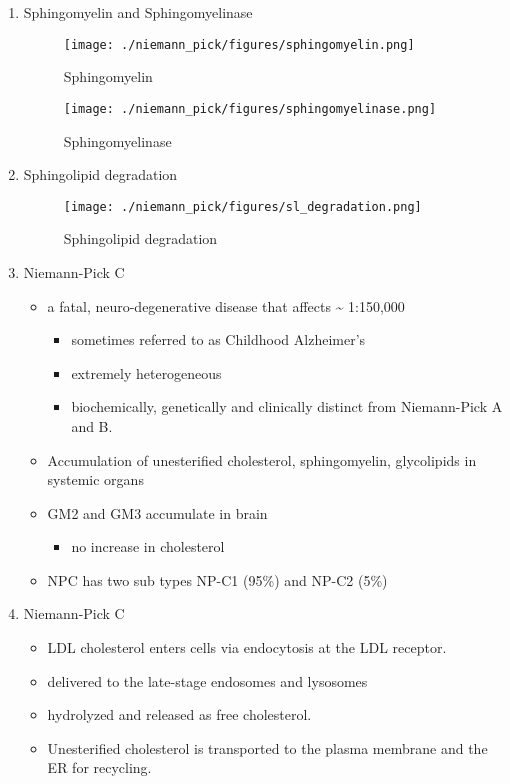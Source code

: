 \documentclass{scrartcl}
\begin{document}
\begin{enumerate}
\item Sphingomyelin and Sphingomyelinase
\label{sec:org6ebf8ad}

\begin{figure}[htbp]
\centering
\texttt{[image: ./niemann\_pick/figures/sphingomyelin.png]}
\caption{\label{fig:org360e3c4}
Sphingomyelin}
\end{figure}

\begin{figure}[htbp]
\centering
\texttt{[image: ./niemann\_pick/figures/sphingomyelinase.png]}
\caption{\label{fig:orgd3763f2}
Sphingomyelinase}
\end{figure}


\item Sphingolipid degradation
\label{sec:org2abaf29}

\begin{figure}[htbp]
\centering
\texttt{[image: ./niemann\_pick/figures/sl\_degradation.png]}
\caption{\label{fig:orgc3dab82}
Sphingolipid degradation}
\end{figure}

\item Niemann-Pick C
\label{sec:org8e96ce5}
\begin{itemize}
\item a fatal, neuro-degenerative disease that affects \textasciitilde{} 1:150,000
\begin{itemize}
\item sometimes referred to as Childhood Alzheimer’s
\item extremely heterogeneous
\item biochemically, genetically and clinically distinct from Niemann-Pick A and B.
\end{itemize}
\item Accumulation of unesterified cholesterol, sphingomyelin, glycolipids in systemic organs
\item GM2 and GM3 accumulate in brain
\begin{itemize}
\item no increase in cholesterol
\end{itemize}
\item NPC has two sub types NP-C1 (95\%) and NP-C2 (5\%)
\end{itemize}

\item Niemann-Pick C
\label{sec:org099c039}

\begin{itemize}
\item LDL cholesterol enters cells via endocytosis at the LDL receptor.
\item delivered to the late-stage endosomes and lysosomes
\item hydrolyzed and released as free cholesterol.
\item Unesterified cholesterol is transported to the plasma membrane and the ER for recycling.


\end{itemize}
\end{enumerate}
\end{document}
